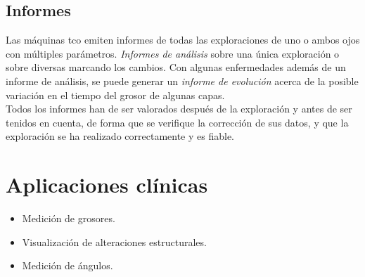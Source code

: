 \subsection{Informes}
Las máquinas \gls{tco} emiten informes de todas las exploraciones de
uno o ambos ojos con múltiples parámetros. \emph{Informes de análisis}
sobre una única exploración o sobre diversas marcando los cambios. Con
algunas enfermedades además de un informe de análisis, se puede
generar un \emph{informe de evolución} acerca de la posible variación
en el tiempo del grosor de algunas capas.\\
Todos los informes han de ser valorados después de la exploración y
antes de ser tenidos en cuenta, de forma que se verifique la
corrección de sus datos, y que la exploración se ha realizado
correctamente y es fiable.

\section{Aplicaciones clínicas}
\begin{itemize}
\item Medición de grosores.
\item Visualización de alteraciones estructurales.
\item Medición de ángulos.
\end{itemize}